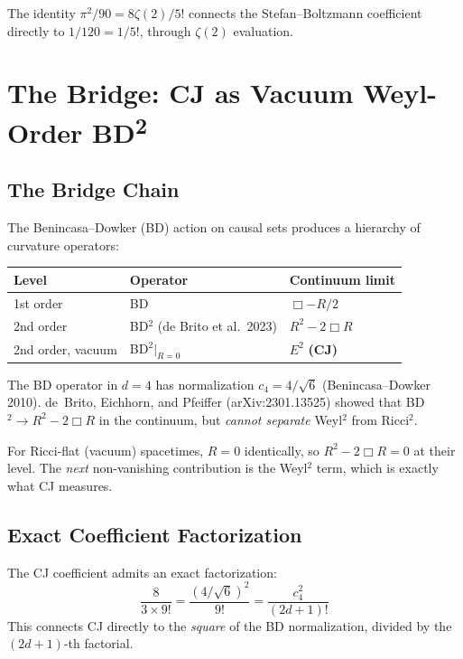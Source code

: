 \documentclass[11pt,a4paper]{article}
\begin{document}
The identity $\pi^2/90 = 8\zeta(2)/5!$ connects the Stefan--Boltzmann coefficient directly to $1/120 = 1/5!$, through $\zeta(2)$ evaluation.

\section{The Bridge: CJ as Vacuum Weyl-Order BD\textsuperscript{2}}

\subsection{The Bridge Chain}

The Benincasa--Dowker (BD) action on causal sets produces a hierarchy of curvature operators:

\begin{center}
\begin{tabular}{lll}
\toprule
Level & Operator & Continuum limit \\
\midrule
1st order & BD & $\Box - R/2$ \\
2nd order & BD$^2$ (de Brito et al.\ 2023) & $R^2 - 2\Box R$ \\
2nd order, vacuum & BD$^2|_{R=0}$ & $E^2$ \textbf{(CJ)} \\
\bottomrule
\end{tabular}
\end{center}

The BD operator in $d=4$ has normalization $c_4 = 4/\sqrt{6}$ (Benincasa--Dowker 2010). de~Brito, Eichhorn, and Pfeiffer (arXiv:2301.13525) showed that BD$^2 \to R^2 - 2\Box R$ in the continuum, but \emph{cannot separate} Weyl$^2$ from Ricci$^2$.

For Ricci-flat (vacuum) spacetimes, $R = 0$ identically, so $R^2 - 2\Box R = 0$ at their level. The \emph{next} non-vanishing contribution is the Weyl$^2$ term, which is exactly what CJ measures.

\subsection{Exact Coefficient Factorization}

The CJ coefficient admits an exact factorization:
\begin{equation}
\frac{8}{3 \times 9!} = \frac{(4/\sqrt{6})^2}{9!} = \frac{c_4^2}{(2d+1)!}
\end{equation}
This connects CJ directly to the \emph{square} of the BD normalization, divided by the $(2d+1)$-th factorial.
\end{document}
